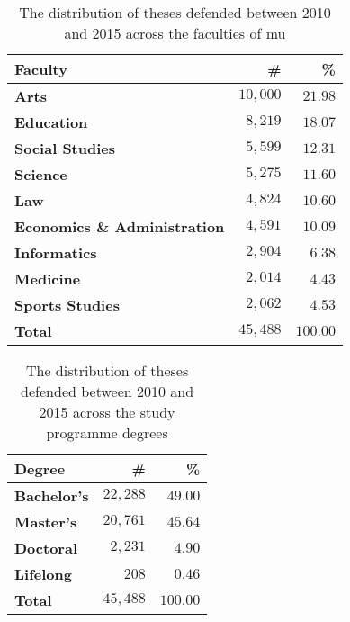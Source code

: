   \begin{table}
    \caption{The distribution of theses defended between 2010 and 2015 across the faculties of \acrshort{mu}}
    \begin{tabularx}{\textwidth}{Xrr}
      \textbf{Faculty} & \textbf{\#} & \textbf{\%} \\
      \hline
      \textbf{Arts}                         & $10{,}000$ & $21.98$ \\%
      \textbf{Education}                    & $8{,}219$  & $18.07$ \\%
      \textbf{Social Studies}               & $5{,}599$  & $12.31$ \\%
      \textbf{Science}                      & $5{,}275$  & $11.60$ \\%
      \textbf{Law}                          & $4{,}824$  & $10.60$ \\%
      \textbf{Economics \& Administration}  & $4{,}591$  & $10.09$ \\%
      \textbf{Informatics}                  & $2{,}904$  &  $6.38$ \\%
      \textbf{Medicine}                     & $2{,}014$  &  $4.43$ \\%
      \textbf{Sports Studies}               & $2{,}062$  &  $4.53$ \\%
      \hline
      \textbf{Total}                        & \textbf{$45{,}488$} & \textbf{$100.00$}
    \end{tabularx}
    \label{table:statistics-faculty}
  \end{table}

  \begin{table}
    \caption{The distribution of theses defended between 2010 and 2015 across the study programme degrees}
    \begin{tabularx}{\textwidth}{Xrr}
      \textbf{Degree} & \textbf{\#} & \textbf{\%} \\
      \hline
      \textbf{Bachelor's} & $22{,}288$ & $49.00$ \\
      \textbf{Master's}   & $20{,}761$ & $45.64$ \\
      \textbf{Doctoral}   &  $2{,}231$ &  $4.90$ \\
      \textbf{Lifelong}   &      $208$ &  $0.46$ \\
      \hline
      \textbf{Total}      & \textbf{$45{,}488$} & \textbf{$100.00$}
    \end{tabularx}
    \label{table:statistics-degree}
  \end{table}
  

